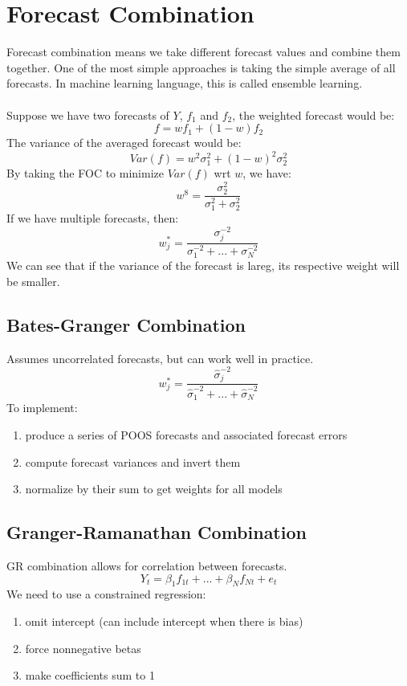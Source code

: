 \documentclass{article}
\begin{document}
\section{Forecast Combination}
Forecast combination means we take different forecast values and combine them together. One of the most simple approaches is taking the simple average of all forecasts. In machine learning language, this is called ensemble learning.\\
\\
Suppose we have two forecasts of $Y$, $f_1$ and $f_2$, the weighted forecast would be:
$$f = wf_1 + (1-w)f_2$$
The variance of the averaged forecast would be:
$$Var(f) = w^2 \sigma_1^2 + (1-w)^2\sigma_2^2$$
By taking the FOC to minimize $Var(f)$ wrt $w$, we have:
$$w^8 = \frac{\sigma_2^2}{\sigma_1^2 + \sigma_2^2}$$
If we have multiple forecasts, then:
$$w_j^* = \frac{\sigma_j^{-2}}{\sigma_1^{-2} + ... + \sigma_N^{-2}}$$
We can see that if the variance of the forecast is lareg, its respective weight will be smaller.

\subsection{Bates-Granger Combination}
Assumes uncorrelated forecasts, but can work well in practice.
$$w_j^* = \frac{\hat{\sigma}_j^{-2}}{\hat{\sigma}_1^{-2} + ... + \hat{\sigma}_N^{-2}}$$
To implement:
\begin{enumerate}
    \item produce a series of POOS forecasts and associated forecast errors
    \item compute forecast variances and invert them
    \item normalize by their sum to get weights for all models
\end{enumerate}

\subsection{Granger-Ramanathan Combination}
GR combination allows for correlation between forecasts. 
$$Y_t = \beta_1 f_{1t} + ... + \beta_N f_{Nt} + e_t$$
We need to use a constrained regression:
\begin{enumerate}
    \item omit intercept (can include intercept when there is bias)
    \item force nonnegative betas
    \item make coefficients sum to 1
\end{enumerate}
\end{document}
